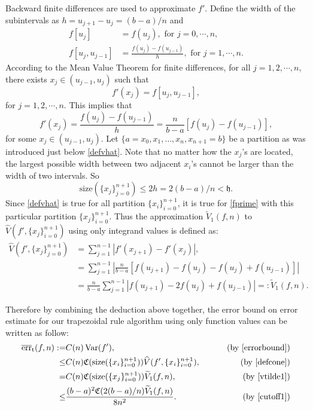 \documentclass{iitthesis}
\DeclareMathOperator{\Var}{Var}
\theoremstyle{definition}
\theoremstyle{remark}
\begin{document}

Backward finite differences are used to approximate $f'$. Define the width of the subintervals as $h=u_{j+1}-u_{j}=(b-a)/n$ and
\begin{align*}
  f[u_{j}]&=f(u_{j}), \text{ for } j=0,\cdots, n,\\
  f[u_{j},u_{j-1}]&=\frac{f(u_{j})-f(u_{j-1})}{h},\text{ for } j=1, \cdots, n.
\end{align*}
According to the Mean Value Theorem for finite differences, for all $j=1,2,\cdots,n$, there exists $x_j\in (u_{j-1},u_{j})$ such that
\begin{equation*}
   f'(x_j)= f[u_{j},u_{j-1}],
\end{equation*}
for $j = 1, 2, \cdots, n.$ This implies that
\begin{equation}\label{fprime}
  f'(x_j)=\frac{f(u_{j})-f(u_{j-1})}{h}=\frac{n}{b-a}[f(u_{j})-f(u_{j-1})],
\end{equation}
for some $x_j\in (u_{j-1},u_{j})$. Let $\{a=x_{0}, x_{1},\ldots,x_{n},x_{n+1}=b\}$ be a partition as was introduced just below \eqref{defvhat}. Note that no matter how the $x_j$'s are located, the largest possible width between two adjacent $x_{i}$'s cannot be larger than the width of two intervals. So
\begin{equation}\label{cutoff1}
  \text{size}(\{x_j\}_{j=0}^{n+1})\leq 2h=2(b-a)/n<\mathfrak{h}.
\end{equation}
Since \eqref{defvhat} is true for all partition $\{x_i\}_{i=0}^{n+1}$, it is true for \eqref{fprime} with this particular partition $\{x_j\}_{i=0}^{n+1}$. Thus the approximation $\widetilde{V}_1(f,n)$ to $\widehat{V}(f',\{x_j\}_{i=0}^{n+1})$ using only integrand values is defined as:
\begin{align}\label{vtilde1}
\nonumber    \widehat{V}(f',\{x_j\}_{j=0}^{n+1})&= \sum_{j=1}^{n-1}\left|f'(x_{j+1})-f'(x_{j})\right|,\\
\nonumber    &=\sum_{j=1}^{n-1}\left|\frac{n}{b-a}[f(u_{j+1})-f(u_{j})-f(u_{j})+f(u_{j-1})]\right|\\
    &=\frac{n}{b-a}\sum_{j=1}^{n-1}\left|f(u_{j+1})-2f(u_{j})+f(u_{j-1})\right|=:\widetilde{V}_1(f,n).
\end{align}

Therefore by combining the deduction above together, the error bound on error estimate for our trapezoidal rule algorithm using only function values can be written as follow:
\begin{align*}
\overline{\text{err}}_{\text{t}}(f,n):=&C(n)\Var(f'),\qquad &\text{ (by \eqref{errorbound})}\\
\leq & C(n)\mathfrak{C}(\text{size}(\{x_i\}_{i=0}^{n+1}))\widehat{V}(f',\{x_i\}_{i=0}^{n+1}), \qquad &\text{ (by \eqref{defcone})}\\
=& C(n)\mathfrak{C}(\text{size}(\{x_j\}_{i=0}^{n+1}))\widetilde{V}_1(f,n), \qquad &\text{ (by \eqref{vtilde1})}\\
  \leq & \frac{(b-a)^2\mathfrak{C}(2(b-a)/n)\widetilde{V}_1(f,n)}{8n^2}.\qquad &\text{ (by \eqref{cutoff1})}
\end{align*}
\end{document}
